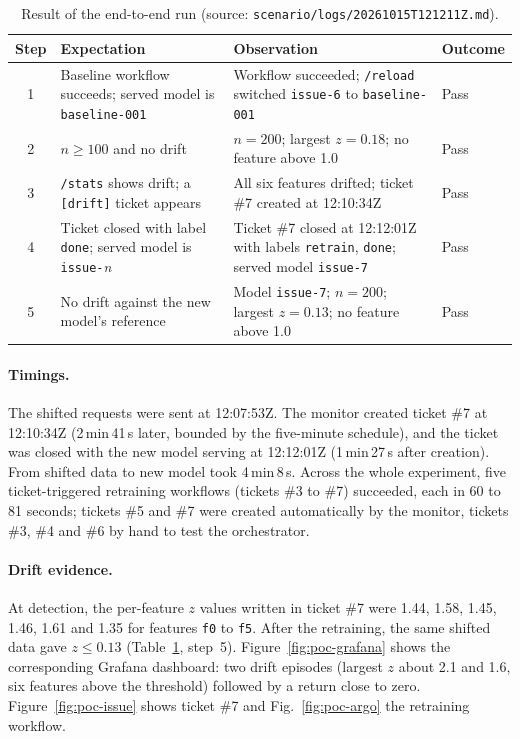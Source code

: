 \documentclass[11pt,a4paper]{article}
\begin{document}
\begin{table}[t]
\centering
\caption{Result of the end-to-end run (source: \texttt{scenario/logs/20261015T121211Z.md}).}
\label{tab:poc-results}
\small
\begin{tabularx}{\textwidth}{@{}c >{\raggedright\arraybackslash}p{4.2cm} X l@{}}
\toprule
Step & Expectation & Observation & Outcome \\
\midrule
1 & Baseline workflow succeeds; served model is \texttt{baseline-001} & Workflow succeeded; \texttt{/reload} switched \texttt{issue-6} to \texttt{baseline-001} & Pass \\
2 & $n \geq 100$ and no drift & $n = 200$; largest $z = 0.18$; no feature above 1.0 & Pass \\
3 & \texttt{/stats} shows drift; a \texttt{[drift]} ticket appears & All six features drifted; ticket \#7 created at 12:10:34Z & Pass \\
4 & Ticket closed with label \texttt{done}; served model is \texttt{issue-}\emph{n} & Ticket \#7 closed at 12:12:01Z with labels \texttt{retrain}, \texttt{done}; served model \texttt{issue-7} & Pass \\
5 & No drift against the new model's reference & Model \texttt{issue-7}; $n = 200$; largest $z = 0.13$; no feature above 1.0 & Pass \\
\bottomrule
\end{tabularx}
\end{table}

\paragraph{Timings.}
The shifted requests were sent at 12:07:53Z. The monitor created ticket \#7 at 12:10:34Z (2\,min\,41\,s later, bounded by the five-minute schedule), and the ticket was closed with the new model serving at 12:12:01Z (1\,min\,27\,s after creation). From shifted data to new model took 4\,min\,8\,s.
Across the whole experiment, five ticket-triggered retraining workflows (tickets \#3 to \#7) succeeded, each in 60 to 81 seconds; tickets \#5 and \#7 were created automatically by the monitor, tickets \#3, \#4 and \#6 by hand to test the orchestrator.

\paragraph{Drift evidence.}
At detection, the per-feature $z$ values written in ticket \#7 were 1.44, 1.58, 1.45, 1.46, 1.61 and 1.35 for features \texttt{f0} to \texttt{f5}. After the retraining, the same shifted data gave $z \leq 0.13$ (Table~\ref{tab:poc-results}, step~5). Figure~\ref{fig:poc-grafana} shows the corresponding Grafana dashboard: two drift episodes (largest $z$ about 2.1 and 1.6, six features above the threshold) followed by a return close to zero. Figure~\ref{fig:poc-issue} shows ticket \#7 and Fig.~\ref{fig:poc-argo} the retraining workflow.
\end{document}
